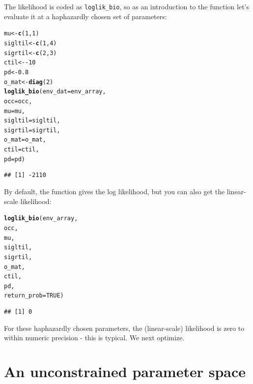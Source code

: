 \documentclass[11pt]{article}\usepackage[]{graphicx}\usepackage[]{xcolor}
\makeatletter
\newcommand{\hlnum}[1]{\textcolor[rgb]{0.686,0.059,0.569}{#1}}%
\newcommand{\hlopt}[1]{\textcolor[rgb]{0,0,0}{#1}}%
\newcommand{\hldef}[1]{\textcolor[rgb]{0.345,0.345,0.345}{#1}}%
\newcommand{\hlkwb}[1]{\textcolor[rgb]{0.69,0.353,0.396}{#1}}%
\newcommand{\hlkwc}[1]{\textcolor[rgb]{0.333,0.667,0.333}{#1}}%
\newcommand{\hlkwd}[1]{\textcolor[rgb]{0.737,0.353,0.396}{\textbf{#1}}}%
\newenvironment{kframe}{%
 \def\at@end@of@kframe{}%
 \ifinner\ifhmode%
  \def\at@end@of@kframe{\end{minipage}}%
  \begin{minipage}{\columnwidth}%
 \fi\fi%
 \def\FrameCommand##1{\hskip\@totalleftmargin \hskip-\fboxsep
 \colorbox{shadecolor}{##1}\hskip-\fboxsep
     \hskip-\linewidth \hskip-\@totalleftmargin \hskip\columnwidth}%
 \MakeFramed {\advance\hsize-\width
   \@totalleftmargin\z@ \linewidth\hsize
   \@setminipage}}%
 {\par\unskip\endMakeFramed%
 \at@end@of@kframe}
\newenvironment{knitrout}{}{} %
\makeatother
\begin{document}
The likelihood is coded as \texttt{loglik\_bio}, so as an introduction to the function 
let's evaluate it at a haphazardly chosen set of parameters:
\begin{knitrout}
\color{fgcolor}\begin{kframe}
\begin{alltt}
\hldef{mu} \hlkwb{<-} \hlkwd{c}\hldef{(}\hlnum{1}\hldef{,} \hlnum{1}\hldef{)}
\hldef{sigltil} \hlkwb{<-} \hlkwd{c}\hldef{(}\hlnum{1}\hldef{,} \hlnum{4}\hldef{)}
\hldef{sigrtil} \hlkwb{<-} \hlkwd{c}\hldef{(}\hlnum{2}\hldef{,} \hlnum{3}\hldef{)}
\hldef{ctil} \hlkwb{<-} \hlopt{-}\hlnum{10}
\hldef{pd} \hlkwb{<-} \hlnum{0.8}
\hldef{o_mat} \hlkwb{<-} \hlkwd{diag}\hldef{(}\hlnum{2}\hldef{)}
\hlkwd{loglik_bio}\hldef{(}\hlkwc{env_dat} \hldef{= env_array,}
           \hlkwc{occ} \hldef{= occ,}
           \hlkwc{mu} \hldef{= mu,}
           \hlkwc{sigltil} \hldef{= sigltil,}
           \hlkwc{sigrtil} \hldef{= sigrtil,}
           \hlkwc{o_mat} \hldef{= o_mat,}
           \hlkwc{ctil} \hldef{= ctil,}
           \hlkwc{pd} \hldef{= pd)}
\end{alltt}
\begin{verbatim}
## [1] -2110
\end{verbatim}
\end{kframe}
\end{knitrout}
\noindent By default, the function gives the log likelihood, but you can also get the linear-scale
likelihood:
\begin{knitrout}
\color{fgcolor}\begin{kframe}
\begin{alltt}
\hlkwd{loglik_bio}\hldef{(env_array,}
           \hldef{occ,}
           \hldef{mu,}
           \hldef{sigltil,}
           \hldef{sigrtil,}
           \hldef{o_mat,}
           \hldef{ctil,}
           \hldef{pd,}
           \hlkwc{return_prob} \hldef{=} \hlnum{TRUE}\hldef{)}
\end{alltt}
\begin{verbatim}
## [1] 0
\end{verbatim}
\end{kframe}
\end{knitrout}
\noindent For these haphazardly chosen parameters, the (linear-scale) likelihood is zero to within 
numeric precision - this is typical. We next optimize.
 
\section{An unconstrained parameter space}
 
\end{document}
